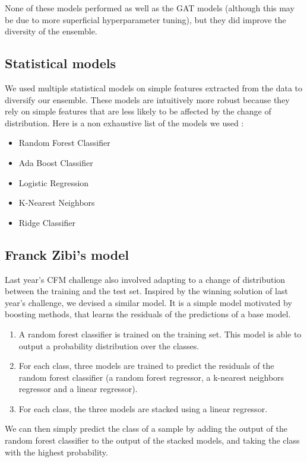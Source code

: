 \documentclass[switch, 11pt]{article}
\begin{document}
\begin{multicols}{2}
    None of these models performed as well as the GAT models (although this may be due to more superficial hyperparameter tuning), but they did improve the diversity of the ensemble.

    \subsection{Statistical models}

    We used multiple statistical models on simple features extracted from the data to diversify our ensemble. These models are intuitively more robust because they rely on simple features that are less likely to be affected by the change of distribution. Here is a non exhaustive list of the models we used :
    \begin{itemize}
        \item Random Forest Classifier
        \item Ada Boost Classifier
        \item Logistic Regression
        \item K-Nearest Neighbors
        \item Ridge Classifier
    \end{itemize}

    \subsection{Franck Zibi's model}

    Last year's CFM challenge also involved adapting to a change of distribution between the training and the test set. Inspired by the winning solution of last year's challenge, we devised a similar model. It is a simple model motivated by boosting methods, that learns the residuals of the predictions of a base model.
    \begin{enumerate}
        \item A random forest classifier is trained on the training set. This model is able to output a probability distribution over the classes.
        \item For each class, three models are trained to predict the residuals of the random forest classifier (a random forest regressor, a k-nearest neighbors regressor and a linear regressor).
        \item For each class, the three models are stacked using a linear regressor.
    \end{enumerate}

    We can then simply predict the class of a sample by adding the output of the random forest classifier to the output of the stacked models, and taking the class with the highest probability.


\end{multicols}
\end{document}
